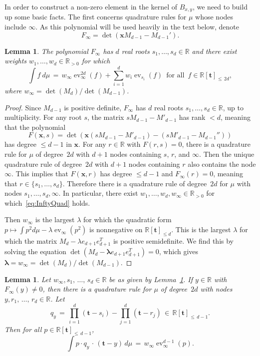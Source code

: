 \documentclass[11pt]{article}
\newtheorem{lemm}[theo]{Lemma}
\theoremstyle{definition}
\numberwithin{equation}{section}
\numberwithin{figure}{section}
\numberwithin{table}{section}
\DeclareMathOperator\ev{ev}
\newcommand\R{\mathbb R}
\renewcommand\t{\mathbf{t}}
\newcommand\x{\mathbf{x}}
\newcommand\blambda{{\bm \lambda}}
\begin{document}
In order to construct a non-zero element in the kernel of $B_{x,y}$, we need to build up some basic facts. The first concerns quadrature rules for $\mu$ whose nodes include $\infty$. As this polynomial will be used heavily in the text below, denote
\[
F_{\infty} = \det(\x M_{d-1} -M_{d-1}').
\]


\begin{lemm}\label{lem:InftyNodes}
The polynomial $F_{\infty}$ has $d$ real roots $s_1, \hdots, s_d \in \R$ and there exist weights $w_1, \hdots, w_d\in \R_{> 0}$ for which
\begin{equation}\label{eq:InftyQuad}
\int f \ d\mu \, = \, w_{\infty} \ev_{\infty}^{2d}(f) + \sum_{i=1}^d w_i \ev_{s_i}(f) \, \text{ for all } \, f\in \R[\t]_{\leq\,2d},
\end{equation}
where $w_{\infty} = \det(M_d)/\det(M_{d-1})$.
\end{lemm}


\begin{proof}
Since $M_{d-1}$ is positive definite, $F_{\infty}$ has $d$ real roots $s_1, \hdots, s_d\in \R$, up to multiplicity. For any root $s$, the matrix $sM_{d-1} - M'_{d-1}$ has rank $<d$, meaning that the polynomial
\[
F(\x,s) = \det(\x(sM_{d-1} - M'_{d-1}) - (sM'_{d-1} -M_{d-1}''))
\]
has degree $\leq d-1$ in $\x$. For any $r\in \R$ with $F(r,s)=0$, there is a quadrature rule for $\mu$ of degree~$2d$ with $d+1$ nodes containing $s$, $r$, and $\infty$. Then the unique quadrature rule of degree~$2d$ with $d+1$ nodes containing $r$ also contains the node $\infty$. This implies that $F(\x,r)$ has degree $\leq d-1$ and $F_\infty(r)=0$, meaning that $r\in \{s_1, \hdots, s_d\}$. Therefore there is a quadrature rule of degree~$2d$ for $\mu$ with nodes $s_1, \hdots, s_d, \infty$. In particular, there exist $w_1, \hdots, w_d, w_\infty\in \R_{>0}$ for which~\eqref{eq:InftyQuad} holds.

Then $w_\infty$ is the largest $\lambda$ for which the quadratic form $p \mapsto \int p^2 d\mu - \lambda \ev_{\infty}(p^2)$ is nonnegative on $\R[\t]_{\leq d}$. This is the largest $\lambda$ for which the matrix $M_d - \lambda e_{d+1}e_{d+1}^T$ is positive semidefinite. We find this by solving the equation $\det(M_d - \blambda e_{d+1}e_{d+1}^T) = 0$, which gives $\blambda = w_{\infty} = \det(M_d)/ \det(M_{d-1})$.
\end{proof}


\begin{lemm}\label{lem:kernel}
Let $w_{\infty}, s_1,\,\hdots,\,s_d\in \R$ be as given by Lemma~\ref{lem:InftyNodes}. If $y\in \R$ with $F_{\infty}(y)\neq 0$, then there is a quadrature rule for $\mu$ of degree~$2d$ with nodes $y, r_1,\,\hdots,\,r_d\in \R$. Let
\[
q_y \, = \, \prod_{i=1}^{d}(\t-s_i) - \prod_{j=1}^d(\t-r_j)\, \in \, \R[\t]_{\leq\, d-1}.
\]
Then for all $p\in \R[\t]_{\leq\,d-1}$,
\[
\int p \cdot q_y\,\cdot\,(\t-y) \, d\mu \, = \, w_\infty \ev^{d-1}_{\infty}(p).
\]
\end{lemm}
\end{document}
